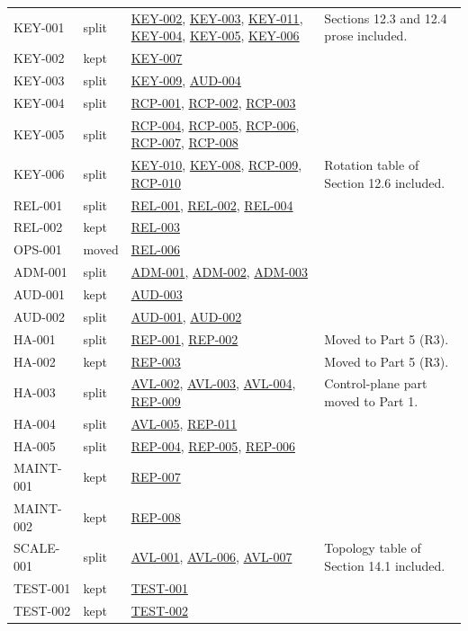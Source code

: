 \documentclass[11pt,a4paper]{article}
\newcommand{\rr}[1]{\hyperlink{req:#1}{#1}}
\begin{document}
\begin{longtable}{@{}P{0.16\textwidth}P{0.09\textwidth}P{0.37\textwidth}P{0.28\textwidth}@{}}
KEY-001 & split & \rr{KEY-002}, \rr{KEY-003}, \rr{KEY-011}, \rr{KEY-004}, \rr{KEY-005}, \rr{KEY-006} & Sections 12.3 and 12.4 prose included.\\
KEY-002 & kept & \rr{KEY-007} & \\
KEY-003 & split & \rr{KEY-009}, \rr{AUD-004} & \\
KEY-004 & split & \rr{RCP-001}, \rr{RCP-002}, \rr{RCP-003} & \\
KEY-005 & split & \rr{RCP-004}, \rr{RCP-005}, \rr{RCP-006}, \rr{RCP-007}, \rr{RCP-008} & \\
KEY-006 & split & \rr{KEY-010}, \rr{KEY-008}, \rr{RCP-009}, \rr{RCP-010} & Rotation table of Section 12.6 included.\\
REL-001 & split & \rr{REL-001}, \rr{REL-002}, \rr{REL-004} & \\
REL-002 & kept & \rr{REL-003} & \\
OPS-001 & moved & \rr{REL-006} & \\
ADM-001 & split & \rr{ADM-001}, \rr{ADM-002}, \rr{ADM-003} & \\
AUD-001 & kept & \rr{AUD-003} & \\
AUD-002 & split & \rr{AUD-001}, \rr{AUD-002} & \\
HA-001 & split & \rr{REP-001}, \rr{REP-002} & Moved to Part 5 (R3).\\
HA-002 & kept & \rr{REP-003} & Moved to Part 5 (R3).\\
HA-003 & split & \rr{AVL-002}, \rr{AVL-003}, \rr{AVL-004}, \rr{REP-009} & Control-plane part moved to Part 1.\\
HA-004 & split & \rr{AVL-005}, \rr{REP-011} & \\
HA-005 & split & \rr{REP-004}, \rr{REP-005}, \rr{REP-006} & \\
MAINT-001 & kept & \rr{REP-007} & \\
MAINT-002 & kept & \rr{REP-008} & \\
SCALE-001 & split & \rr{AVL-001}, \rr{AVL-006}, \rr{AVL-007} & Topology table of Section 14.1 included.\\
TEST-001 & kept & \rr{TEST-001} & \\
TEST-002 & kept & \rr{TEST-002} & \\
\bottomrule
\end{longtable}
\end{document}
